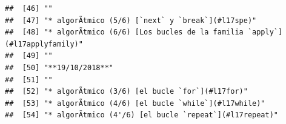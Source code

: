\documentclass[
]{book}
\begin{document}
\begin{verbatim}
##  [46] ""                                                                                                                                                                                                                                                                                                        
##  [47] "* algorÃ­tmico (5/6) [`next` y `break`](#l17spe)"                                                                                                                                                                                                                                                        
##  [48] "* algorÃ­tmico (6/6) [Los bucles de la familia `apply`](#l17applyfamily)"                                                                                                                                                                                                                                
##  [49] ""                                                                                                                                                                                                                                                                                                        
##  [50] "**19/10/2018**"                                                                                                                                                                                                                                                                                          
##  [51] ""                                                                                                                                                                                                                                                                                                        
##  [52] "* algorÃ­tmico (3/6) [el bucle `for`](#l17for)"                                                                                                                                                                                                                                                          
##  [53] "* algorÃ­tmico (4/6) [el bucle `while`](#l17while)"                                                                                                                                                                                                                                                      
##  [54] "* algorÃ­tmico (4'/6) [el bucle `repeat`](#l17repeat)"                                                                                                                                                                                                                                                   

\end{verbatim}
\end{document}
